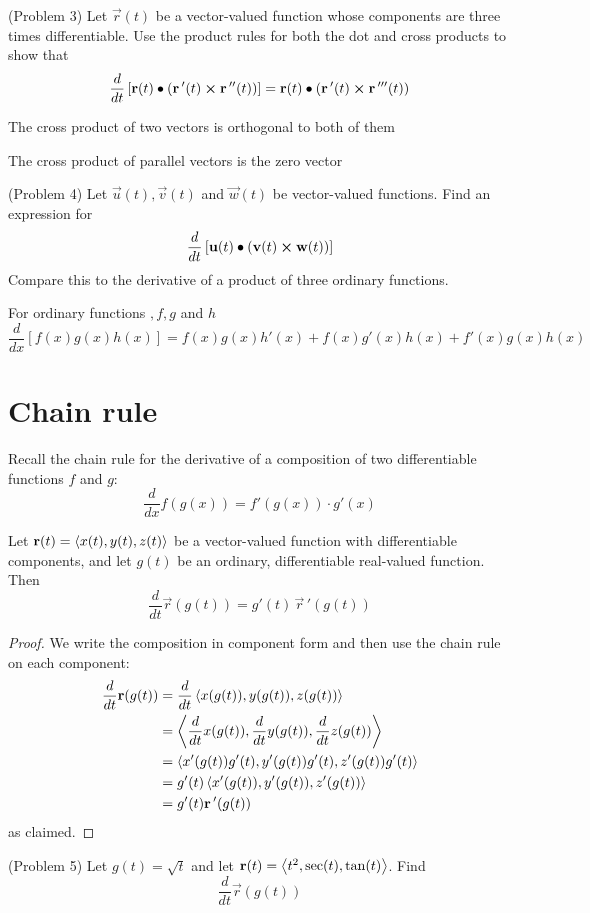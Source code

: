 \documentclass[handout]{ximera}
\begin{document}
\begin{problem}(Problem 3)
Let $\vec r(t)$ be a vector-valued function whose components are three times differentiable. Use the product rules for both the dot and cross products to show that
\[
\frac{d}{dt}\left[\mathbf r(t) \bullet \left(\mathbf r\,'(t) \boldsymbol\times \mathbf r\,''(t)\right)\right] = \mathbf r(t) \bullet \left(\mathbf r\,'(t) \boldsymbol\times \mathbf r\,'''(t)\right)
\]
\begin{hint}
The cross product of two vectors is orthogonal to both of them
\end{hint}
\begin{hint}
The cross product of parallel vectors is the zero vector
\end{hint}
\end{problem}

\begin{problem}(Problem 4)
Let $\vec u(t), \vec v(t)$ and $\vec w(t)$ be vector-valued functions. Find an expression for
\[
\frac{d}{dt}\left[ \mathbf u(t) \bullet \left(\mathbf v(t) \boldsymbol\times \mathbf w(t)\right)\right]
\]
Compare this to the derivative of a product of three ordinary functions.
\begin{hint}
For ordinary functions $,f, g$ and $h$
\[
\frac{d}{dx}\left[f(x)g(x)h(x)\right] = f(x)g(x)h'(x) + f(x)g'(x)h(x) + f'(x)g(x)h(x)
\]
\end{hint}
\end{problem}

\section{Chain rule}
Recall the chain rule for the derivative of a composition of two differentiable functions $f$ and $g$:
\[
\frac{d}{dx} f(g(x)) = f'(g(x)) \cdot g'(x)
\]

\begin{proposition}
Let $\mathbf r(t) = \left\langle x(t), y(t),z(t)\right\rangle$ be a vector-valued function with differentiable components, and let $g(t)$ be an ordinary, differentiable real-valued function.
Then
\[
\frac{d}{dt}\vec r(g(t)) = g'(t)\,\vec r\,'(g(t))
\]
\end{proposition}
\begin{proof}
We write the composition in component form and then use the chain rule on each component:
\begin{align*}
\frac{d}{dt} \mathbf r(g(t)) &= \frac{d}{dt} \left\langle x(g(t)), y(g(t)),z(g(t))\right\rangle\\
&= \left\langle \frac{d}{dt} x(g(t)), \frac{d}{dt} y(g(t)), \frac{d}{dt} z(g(t))\right\rangle\\
&= \left\langle x'(g(t)) g'(t), y'(g(t)) g'(t), z'(g(t)) g'(t)\right\rangle\\
&= g'(t)\left\langle x'(g(t)), y'(g(t)), z'(g(t))\right\rangle\\
&= g'(t) \mathbf r\,'(g(t))
\end{align*}
as claimed.
\end{proof}

\begin{problem}(Problem 5)
Let $g(t) = \sqrt t$ and let $\mathbf r(t) = \left\langle t^2, \sec(t), \tan(t)\right\rangle$. Find
\[
\frac{d}{dt} \vec r(g(t))
\]
\end{problem}
 
\end{document}

